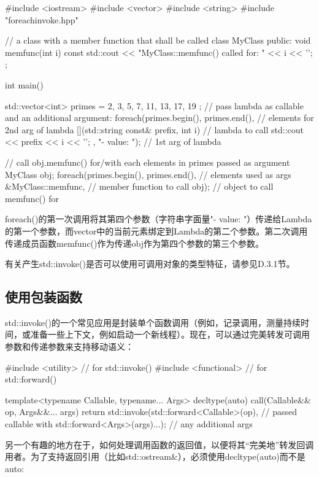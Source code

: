 \begin{cpp}
#include <iostream>
#include <vector>
#include <string>
#include "foreachinvoke.hpp"

// a class with a member function that shall be called
class MyClass {
	public:
	void memfunc(int i) const {
		std::cout << "MyClass::memfunc() called for: " << i << '\n';
	}
};

int main() {
	std::vector<int> primes = { 2, 3, 5, 7, 11, 13, 17, 19 };
	// pass lambda as callable and an additional argument:
	foreach(primes.begin(), primes.end(), // elements for 2nd arg of lambda
			[](std::string const& prefix, int i) { // lambda to call
				std::cout << prefix << i << '\n';
			},
			"- value: "); // 1st arg of lambda

	// call obj.memfunc() for/with each elements in primes passed as argument
	MyClass obj;
	foreach(primes.begin(), primes.end(), // elements used as args
			&MyClass::memfunc, // member function to call
			obj); // object to call memfunc() for
}
\end{cpp}

foreach()的第一次调用将其第四个参数（字符串字面量"- value: "）传递给Lambda的第一个参数，而vector中的当前元素绑定到Lambda的第二个参数。第二次调用传递成员函数memfunc()作为传递obj作为第四个参数的第三个参数。

有关产生std::invoke()是否可以使用可调用对象的类型特征，请参见D.3.1节。

\subsection{使用包装函数}

std::invoke()的一个常见应用是封装单个函数调用（例如，记录调用，测量持续时间，或准备一些上下文，例如启动一个新线程）。现在，可以通过完美转发可调用参数和传递参数来支持移动语义：

\begin{cpp}
#include <utility> // for std::invoke()
#include <functional> // for std::forward()

template<typename Callable, typename... Args>
decltype(auto) call(Callable&& op, Args&&... args) {
	return std::invoke(std::forward<Callable>(op), // passed callable with
					   std::forward<Args>(args)...); // any additional args
}
\end{cpp}

另一个有趣的地方在于，如何处理调用函数的返回值，以便将其“完美地”转发回调用者。为了支持返回引用（比如std::ostream\&），必须使用decltype(auto)而不是auto:


